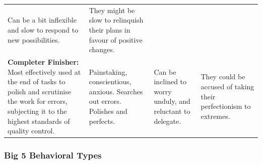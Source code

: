\documentclass[]{book}
\begin{document}
\begin{longtable}[]{@{}llll@{}}
\begin{minipage}[t]{0.20\columnwidth}
Can be a bit inflexible and slow to respond to new possibilities.\strut
\end{minipage} & \begin{minipage}[t]{0.22\columnwidth}\raggedright
They might be slow to relinquish their plans in favour of positive changes.\strut
\end{minipage}\tabularnewline
\begin{minipage}[t]{0.21\columnwidth}\raggedright
\textbf{Completer Finisher:} Most effectively used at the end of tasks to polish and scrutinise the work for errors, subjecting it to the highest standards of quality control.\strut
\end{minipage} & \begin{minipage}[t]{0.25\columnwidth}\raggedright
Painstaking, conscientious, anxious. Searches out errors. Polishes and perfects.\strut
\end{minipage} & \begin{minipage}[t]{0.20\columnwidth}\raggedright
Can be inclined to worry unduly, and reluctant to delegate.\strut
\end{minipage} & \begin{minipage}[t]{0.22\columnwidth}\raggedright
They could be accused of taking their perfectionism to extremes.\strut
\end{minipage}\tabularnewline
\bottomrule
\end{longtable}

\hypertarget{big-5-behavioral-types}{%
\subsubsection{Big 5 Behavioral Types}\label{big-5-behavioral-types}}
\end{document}
